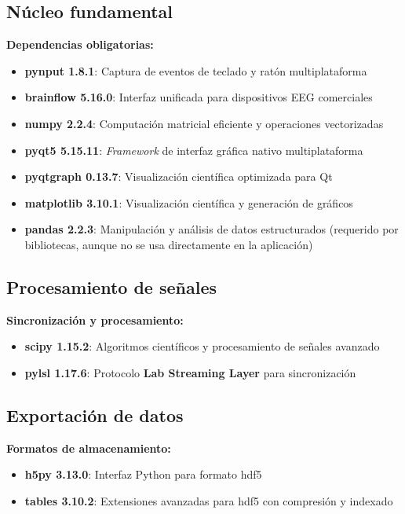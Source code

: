 \subsection{Núcleo fundamental}
\label{subsec:nucleo_fundamental}

\textbf{Dependencias obligatorias:}
\begin{itemize}
    \item \textbf{pynput 1.8.1}: Captura de eventos de teclado y ratón multiplataforma~\cite{pynput_docs}
    \item \textbf{brainflow 5.16.0}: Interfaz unificada para dispositivos EEG comerciales~\cite{brainflow}
    \item \textbf{numpy 2.2.4}: Computación matricial eficiente y operaciones vectorizadas~\cite{van2011numpy}
    \item \textbf{pyqt5 5.15.11}: \textit{Framework} de interfaz gráfica nativo multiplataforma~\cite{pyqt5_docs}
    \item \textbf{pyqtgraph 0.13.7}: Visualización científica optimizada para Qt
    \item \textbf{matplotlib 3.10.1}: Visualización científica y generación de gráficos
    \item \textbf{pandas 2.2.3}: Manipulación y análisis de datos estructurados (requerido por bibliotecas, aunque no se usa directamente en la aplicación)
\end{itemize}

\subsection{Procesamiento de señales}
\label{subsec:procesamiento_seniales}

\textbf{Sincronización y procesamiento:}
\begin{itemize}
    \item \textbf{scipy 1.15.2}: Algoritmos científicos y procesamiento de señales avanzado~\cite{virtanen2020scipy}
    \item \textbf{pylsl 1.17.6}: Protocolo \textbf{Lab Streaming Layer} para sincronización~\cite{kothe2013lab}
\end{itemize}

\subsection{Exportación de datos}
\label{subsec:exportacion_datos}

\textbf{Formatos de almacenamiento:}
\begin{itemize}
    \item \textbf{h5py 3.13.0}: Interfaz Python para formato \acrshort{hdf5}~\cite{folk2011overview}
    \item \textbf{tables 3.10.2}: Extensiones avanzadas para \acrshort{hdf5} con compresión y indexado
\end{itemize}

